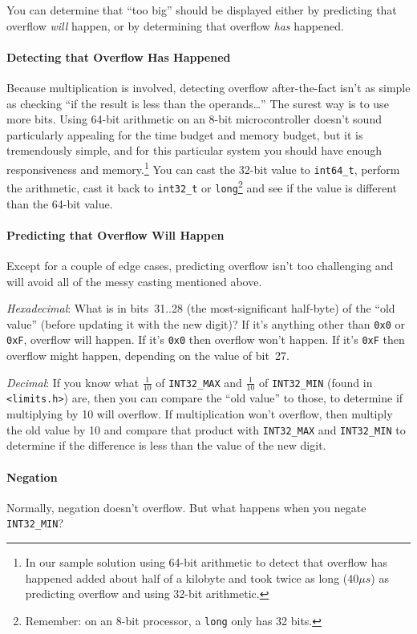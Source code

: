 {    You can determine that ``too big'' should be displayed either by predicting that overflow \textit{will} happen, or by determining that overflow \textit{has} happened.

    \paragraph{Detecting that Overflow Has Happened}

    Because multiplication is involved, detecting overflow after-the-fact isn't as simple as checking ``if the result is less than the operands\dots''
    The surest way is to use more bits.
    Using 64-bit arithmetic on an 8-bit microcontroller doesn't sound particularly appealing for the time budget and memory budget, but it is tremendously simple, and for this particular system you should have enough responsiveness and memory.\footnote{
        In our sample solution using 64-bit arithmetic to detect that overflow has happened added about half of a kilobyte and took twice as long ($40\mu s$) as predicting overflow and using 32-bit arithmetic.
    }
    You can cast the 32-bit value to \lstinline{int64_t}, perform the arithmetic, cast it back to \lstinline{int32_t} or \lstinline{long}\footnote{
        Remember: on an 8-bit processor, a \lstinline{long} only has 32 bits.
    } and see if the value is different than the 64-bit value.


    \paragraph{Predicting that Overflow Will Happen}

    Except for a couple of edge cases, predicting overflow isn't too challenging and will avoid all of the messy casting mentioned above.

    \textit{Hexadecimal}: What is in bits~31..28 (the most-significant half-byte) of the ``old value'' (before updating it with the new digit)?
    If it's anything other than \lstinline{0x0} or \lstinline{0xF}, overflow will happen.
    If it's \lstinline{0x0} then overflow won't happen.
    If it's \lstinline{0xF} then overflow might happen, depending on the value of bit~27.

    \textit{Decimal}: If you know what $\frac{1}{10}$ of \lstinline{INT32_MAX} and $\frac{1}{10}$ of \lstinline{INT32_MIN} (found in \lstinline{<limits.h>}) are, then you can compare the ``old value'' to those, to determine if multiplying by 10 will overflow.
    If multiplication won't overflow, then multiply the old value by 10 and compare that product with \lstinline{INT32_MAX} and \lstinline{INT32_MIN} to determine if the difference is less than the value of the new digit.

    \paragraph{Negation}

    Normally, negation doesn't overflow.
    But what happens when you negate \lstinline{INT32_MIN}?

}{}
